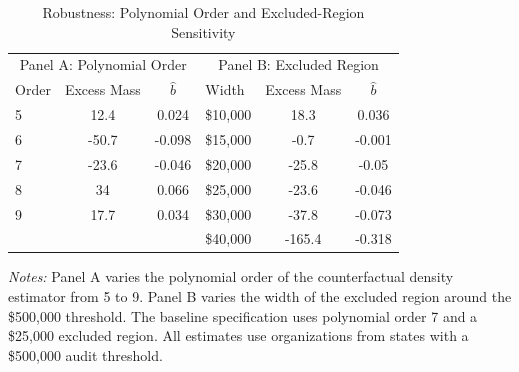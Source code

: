 \begin{table}[t]
\centering
\caption{Robustness: Polynomial Order and Excluded-Region Sensitivity}
\label{tab:robustness}
\begin{tabular}{lcc|lcc}
\hline\hline
\multicolumn{3}{c|}{Panel A: Polynomial Order} & \multicolumn{3}{c}{Panel B: Excluded Region} \\
Order & Excess Mass & $\hat{b}$ & Width & Excess Mass & $\hat{b}$ \\
\hline
5 & 12.4 & 0.024 & \$10,000 & 18.3 & 0.036 \\
6 & -50.7 & -0.098 & \$15,000 & -0.7 & -0.001 \\
7 & -23.6 & -0.046 & \$20,000 & -25.8 & -0.05 \\
8 & 34 & 0.066 & \$25,000 & -23.6 & -0.046 \\
9 & 17.7 & 0.034 & \$30,000 & -37.8 & -0.073 \\
& & & \$40,000 & -165.4 & -0.318 \\
\hline\hline
\end{tabular}
\begin{tablenotes}[flushleft]
\small
\item \textit{Notes:} Panel A varies the polynomial order of the counterfactual density estimator from 5 to 9. Panel B varies the width of the excluded region around the \$500,000 threshold. The baseline specification uses polynomial order 7 and a \$25,000 excluded region. All estimates use organizations from states with a \$500,000 audit threshold.
\end{tablenotes}
\end{table}
